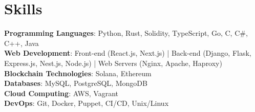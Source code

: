 
\section{Skills}

\begin{itemize}[leftmargin=0.15in, label={}]

\small{\item{\textbf{Programming Languages}{: Python, Rust, Solidity, TypeScript, Go,  C, C\#, C++,  Java } \\

\textbf{Web Development}{: Front-end (React.js, Next.js) | Back-end (Django, Flask, Express.js, Nest.js, Node.js) | Web Servers (Nginx, Apache, Haproxy)} \\

\textbf{Blockchain Technologies}{: Solana, Ethereum } \\

\textbf{Databases}{: MySQL, PostgreSQL, MongoDB } \\

\textbf{Cloud Computing}{: AWS, Vagrant} \\

\textbf{DevOps}{: Git, Docker, Puppet, CI/CD, Unix/Linux } \\

}}

\end{itemize}